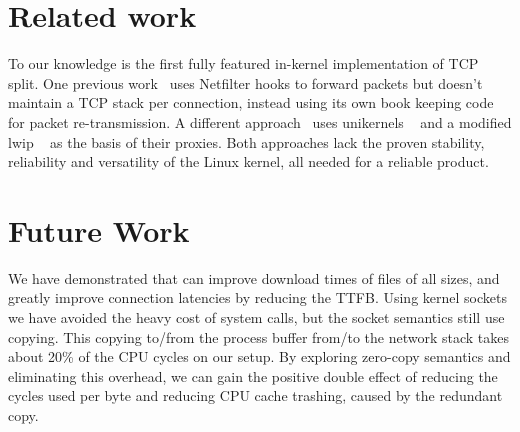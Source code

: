 \section{Related work}
To our knowledge \oursys is the first fully featured in-kernel implementation of TCP split.
One previous work~\cite{kernelsplit} uses Netfilter hooks to forward packets but doesn't maintain a TCP stack per connection, instead using its own book keeping code for packet re-transmission.
A different approach~\cite{siracusano2016miniproxy} uses unikernels ~\cite{kivity2014v} and a modified lwip ~\cite{dunkels2001design} as the basis of their proxies. Both approaches lack the proven stability, reliability and versatility of the Linux kernel, all needed for a reliable product.

\section{Future Work}
We have demonstrated that \oursys can improve download times of files of all sizes, and greatly improve connection latencies by reducing the TTFB. Using kernel sockets we have avoided the heavy cost of system calls, but the socket semantics still use copying. This copying to/from the process buffer from/to the network stack takes about 20\% of the CPU cycles on our setup. By exploring zero-copy semantics and eliminating this overhead, we can gain the positive double effect of reducing the cycles used per byte and reducing CPU cache trashing, caused by the redundant copy.